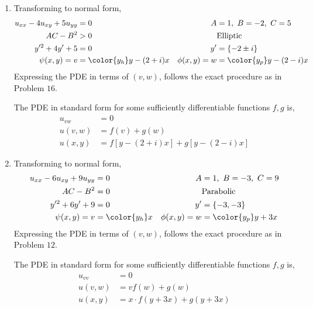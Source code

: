 \begin{enumerate}
    \item Transforming to normal form,
          \begin{align}
              u_{xx} - 4u_{xy} + 5u_{yy} & = 0                         &
              A                          & = 1,\ B = -2,\ C = 5          \\
              AC - B^2                   & > 0                         &
                                         & \text{Elliptic}               \\
              y'^2 + 4y' + 5             & = 0                         &
              y'                         & = \{-2 \pm i\}                \\
              \psi(x, y) = v             & = \color{y_h} y - (2 + i) x &
              \phi(x, y) = w             & = \color{y_p} y - (2 - i) x
          \end{align}
          Expressing the PDE in terms of $ (v, w) $, follows the exact procedure as
          in Problem $ 16 $. \par
          The PDE in standard form for some sufficiently differentiable functions
          $ f, g $ is,
          \begin{align}
              u_{vw}  & = 0                                 \\
              u(v, w) & = f(v) + g(w)                       \\
              u(x, y) & = f[y - (2 + i)x] + g[y - (2 - i)x]
          \end{align}

    \item Transforming to normal form,
          \begin{align}
              u_{xx} - 6u_{xy} + 9u_{yy} & = 0                  &
              A                          & = 1,\ B = -3,\ C = 9   \\
              AC - B^2                   & = 0                  &
                                         & \text{Parabolic}       \\
              y'^2 + 6y' + 9             & = 0                  &
              y'                         & = \{-3, -3\}           \\
              \psi(x, y) = v             & = \color{y_h} x      &
              \phi(x, y) = w             & = \color{y_p} y + 3x
          \end{align}
          Expressing the PDE in terms of $ (v, w) $, follows the exact procedure as
          in Problem $ 12 $. \par
          The PDE in standard form for some sufficiently differentiable functions
          $ f, g $ is,
          \begin{align}
              u_{vv}  & = 0                             \\
              u(v, w) & = v f(w) + g(w)                 \\
              u(x, y) & = x \cdot f(y + 3x) + g(y + 3x)
          \end{align}


\end{enumerate}
